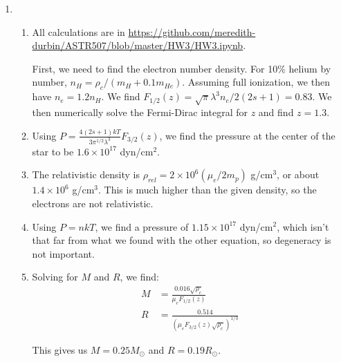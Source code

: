 \documentclass[11pt]{article}
\begin{document}
\begin{enumerate}
\item
	\begin{enumerate}
    \item All calculations are in \url{https://github.com/meredith-durbin/ASTR507/blob/master/HW3/HW3.ipynb}.
    
    First, we need to find the electron number density. For 10\% helium by number, $n_H = \rho_c / (m_H + 0.1m_{He})$. Assuming full ionization, we then have $n_e = 1.2 n_H$. We find $F_{1/2}(z) = \sqrt{\pi}\lambda^3n_e/2(2s+1) = 0.83$. We then numerically solve the Fermi-Dirac integral for $z$ and find $z = 1.3$.
    
    \item Using $P = \frac{4(2s+1)kT}{3\pi^{1/2}\lambda^3}F_{3/2}(z)$, we find the pressure at the center of the star to be $1.6 \times 10^{17}$ dyn/cm$^2$.
    
    \item The relativistic density is $\rho_{rel} = 2\times10^6 (\mu_e/2m_p)$ g/cm$^3$, or about $1.4 \times 10^6$ g/cm$^3$. This is much higher than the given density, so the electrons are not relativistic.
    
    \item Using $P = nkT$, we find a pressure of $1.15 \times 10^{17}$ dyn/cm$^2$, which isn't that far from what we found with the other equation, so degeneracy is not important.
    
    \item Solving for $M$ and $R$, we find:
    \begin{align}
    M &= \frac{0.016 \sqrt{\rho_c}}{\mu_e F_{1/2}(z)}  \\
    R &= \frac{0.514}{(\mu_e F_{3/2}(z) \sqrt{\rho_c})^{1/3}}
    \end{align}
    
    This gives us $M = 0.25M_\odot$ and $R = 0.19R_\odot$.
    
    \end{enumerate}

\end{enumerate}
\end{document}
